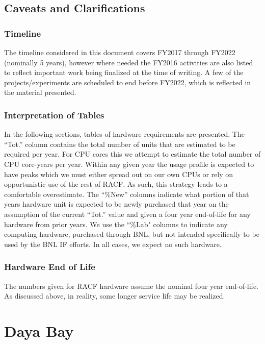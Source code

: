 \documentclass[pdftex,12pt,letter]{article}
\begin{document}
\subsection{Caveats and Clarifications}

\subsubsection{Timeline}
The timeline considered in this document covers FY2017 through FY2022 (nominally 5 years), however where needed
the FY2016 activities are also listed to reflect important work being finalized at the time of writing.
A few of the projects/experiments are scheduled to end before FY2022, which is reflected in the material presented.

\subsubsection{Interpretation of Tables}

In the following sections, tables of hardware
requirements are presented.
The ``Tot.'' column contains the total number of units that are
estimated to be required per year.
For CPU cores this we attempt to estimate the total number of CPU
core-years per year.
Within any given year the usage profile is expected to have peaks
which we must either spread out on our own CPUs or rely on
opportunistic use of the rest of RACF.
As such, this strategy leads to a comfortable overestimate. 
The ``\%New'' columns indicate what portion of that years hardware
unit is expected to be newly purchased that year on the assumption of
the current ``Tot.'' value and given a four year end-of-life for any
hardware from prior years.
We use the ``\%Lab" columns to indicate any computing hardware,
purchased through BNL, but not intended specifically to be used by the
BNL IF efforts. In all cases, we expect no such hardware.

\subsubsection{Hardware End of Life}

The numbers given for RACF hardware assume the nominal four year
end-of-life.
As discussed above, in reality, some longer service life may be
realized.

\pagebreak
\section{Daya Bay}
\end{document}
